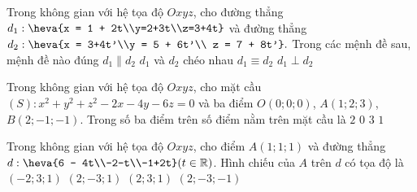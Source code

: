 \begin{ex}%
Trong không gian với hệ tọa độ $Oxyz$, cho đường thẳng $d_1: \heva{x = 1 + 2t\\y=2+3t\\z=3+4t}$ và đường thẳng $d_2: \heva{x = 3+4t'\\y = 5 + 6t'\\ z = 7 + 8t'}.$ Trong các mệnh đề sau, mệnh đề nào đúng
\choice
{$d_1 \parallel d_2$}
{$d_1$ và $d_2$ chéo nhau}
{\True $d_1 \equiv d_2$}
{$d_1 \perp d_2$}
\end{ex}



\begin{ex}%
Trong không gian với hệ tọa độ $Oxyz$, cho mặt cầu $(S): x^2 + y^2 + z^2 - 2x - 4y - 6z = 0$ và ba điểm $O(0; 0; 0)$, $A(1; 2; 3)$, $B(2; -1; -1)$. Trong số ba điểm trên số điểm nằm trên mặt cầu là
\choice
{$2$}
{$0$}
{$3$}
{\True $1$}
\end{ex}




\begin{ex}%
Trong không gian với hệ tọa độ $Oxyz$, cho điểm $A(1; 1; 1)$ và đường thẳng $d: \heva{6 - 4t\\-2-t\\-1+2t}(t \in \mathbb{R})$. Hình chiếu của $A$ trên $d$ có tọa độ là
\choice
{$(-2; 3; 1)$}
{\True $(2; -3; 1)$}
{$(2; 3; 1)$}
{$(2; -3; -1)$}
\end{ex}





